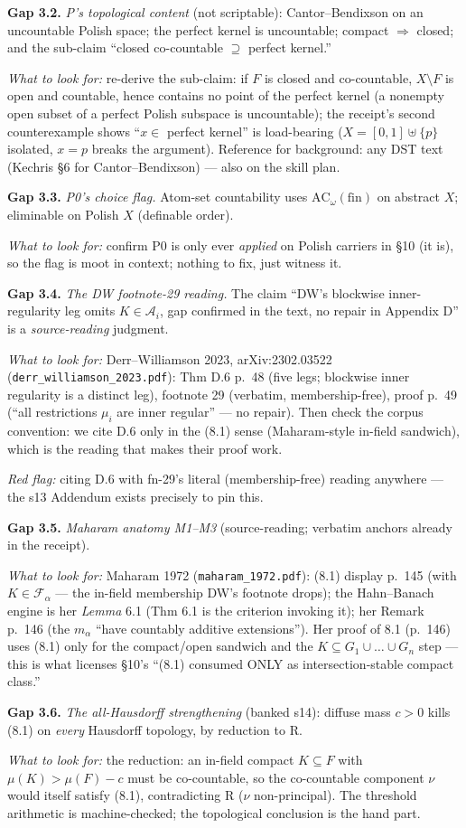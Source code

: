 \documentclass[11pt]{article}
\newcommand{\file}[1]{\texttt{\small #1}}
\newcommand{\gap}[1]{\medskip\noindent\textbf{Gap #1.}}
\newcommand{\lookfor}{\par\smallskip\noindent\emph{What to look for:} }
\newcommand{\redflag}{\par\smallskip\noindent\emph{Red flag:} }
\begin{document}
\gap{3.2} \emph{P's topological content} (not scriptable):
Cantor--Bendixson on an uncountable Polish space; the perfect kernel
is uncountable; compact $\Rightarrow$ closed; and the sub-claim
``closed co-countable $\supseteq$ perfect kernel.''
\lookfor re-derive the sub-claim: if $F$ is closed and co-countable,
$X \setminus F$ is open and countable, hence contains no point of the
perfect kernel (a nonempty open subset of a perfect Polish subspace is
uncountable); the receipt's second counterexample shows ``$x \in$
perfect kernel'' is load-bearing ($X = [0,1] \uplus \{p\}$ isolated,
$x = p$ breaks the argument). Reference for background: any DST text
(Kechris \S6 for Cantor--Bendixson) --- also on the skill plan.

\gap{3.3} \emph{P0's choice flag.} Atom-set countability uses
$\mathrm{AC}_\omega(\mathrm{fin})$ on abstract $X$; eliminable on
Polish $X$ (definable order).
\lookfor confirm P0 is only ever \emph{applied} on Polish carriers in
\S10 (it is), so the flag is moot in context; nothing to fix, just
witness it.

\gap{3.4} \emph{The DW footnote-29 reading.} The claim ``DW's
blockwise inner-regularity leg omits $K \in \mathcal A_i$, gap
confirmed in the text, no repair in Appendix D'' is a
\emph{source-reading} judgment.
\lookfor Derr--Williamson 2023, arXiv:2302.03522
(\file{derr\_williamson\_2023.pdf}): Thm D.6 p.~48 (five legs;
blockwise inner regularity is a distinct leg), footnote 29 (verbatim,
membership-free), proof p.~49 (``all restrictions $\mu_i$ are inner
regular'' --- no repair). Then check the corpus convention: we cite
D.6 only in the (8.1) sense (Maharam-style in-field sandwich), which
is the reading that makes their proof work.
\redflag citing D.6 with fn-29's literal (membership-free) reading
anywhere --- the s13 Addendum exists precisely to pin this.

\gap{3.5} \emph{Maharam anatomy M1--M3} (source-reading; verbatim
anchors already in the receipt).
\lookfor Maharam 1972 (\file{maharam\_1972.pdf}): (8.1) display
p.~145 (with $K \in \mathcal F_\alpha$ --- the in-field membership DW's
footnote drops); the Hahn--Banach engine is her \emph{Lemma} 6.1 (Thm
6.1 is the criterion invoking it); her Remark p.~146 (the $m_\alpha$
``have countably additive extensions''). Her proof of 8.1 (p.~146)
uses (8.1) only for the compact/open sandwich and the $K \subseteq
G_1 \cup \dots \cup G_n$ step --- this is what licenses \S10's
``(8.1) consumed ONLY as intersection-stable compact class.''

\gap{3.6} \emph{The all-Hausdorff strengthening} (banked s14): diffuse
mass $c > 0$ kills (8.1) on \emph{every} Hausdorff topology, by
reduction to R.
\lookfor the reduction: an in-field compact $K \subseteq F$ with
$\mu(K) > \mu(F) - c$ must be co-countable, so the co-countable
component $\nu$ would itself satisfy (8.1), contradicting R ($\nu$
non-principal). The threshold arithmetic is machine-checked; the
topological conclusion is the hand part.
\end{document}

